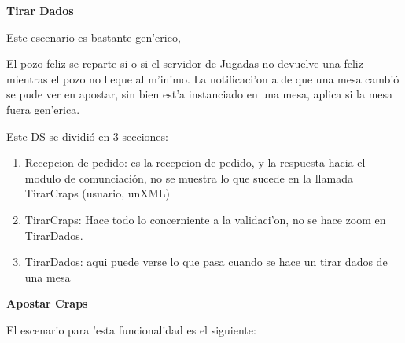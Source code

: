 



\textbf{Tirar Dados}


Este escenario es bastante gen'erico,


% 

El pozo feliz se reparte si o si el servidor de Jugadas no devuelve una feliz mientras el pozo no lleque al m'inimo.
La notificaci'on a de que una mesa cambió se pude ver en apostar, sin bien est'a instanciado en una mesa, aplica si la mesa fuera gen'erica.


Este DS se dividió en 3 secciones:
\begin{enumerate}
 \item Recepcion de pedido: es la recepcion de pedido,  y la respuesta hacia el modulo de comunciación, no se muestra lo que sucede en la llamada TirarCraps (usuario, unXML)
\item  TirarCraps: Hace todo lo concerniente a la validaci'on, no se hace zoom en TirarDados.
\item TirarDados: aqui puede verse lo que pasa cuando se hace un tirar dados de una mesa
\end{enumerate}

\clearpage
\textbf{Apostar Craps}

El escenario para 'esta funcionalidad es el siguiente:

